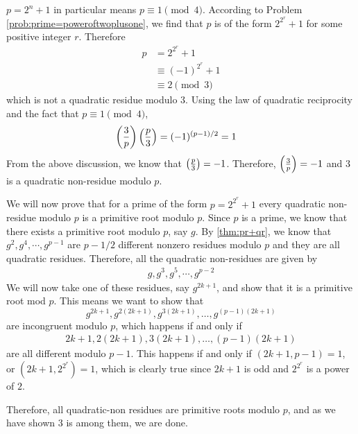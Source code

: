 \begin{solution}[1]
	$p=2^n+1$ in particular means $p \equiv 1 \pmod{4}$.
	According to Problem \ref{prob:prime=poweroftwoplusone}, we find that $p$ is of the form $2^{2^r} + 1$ for some positive integer $r$. Therefore
		\begin{align*}
			p
				& = 2^{2^{r}} +1\\
				& \equiv (-1)^{2^r} +1\\
				& \equiv 2 \pmod{3}
		\end{align*}
	which is not a quadratic residue modulo $3$.
	Using the law of quadratic reciprocity and the fact that $p \equiv 1 \pmod{4}$,
		\begin{align*}
			\left(\dfrac{3}{p}\right)\left(\dfrac{p}{3}\right)
				& = (-1)^{(p-1)/2} = 1
		\end{align*}
	From the above discussion, we know that $\left(\frac{p}{3}\right) = -1$. Therefore, $\left(\frac{3}{p}\right)=-1$ and $3$ is a quadratic non-residue modulo $p$.

	We will now prove that for a prime of the form $p=2^{2^{r}}+1$ every quadratic non-residue modulo $p$ is a primitive root modulo $p$. Since $p$ is a prime, we know that there exists a primitive root modulo $p$, say $g$. By \autoref{thm:pr+qr}, we know that $g^2,g^4,\cdots,g^{p-1}$ are ${p-1}/{2}$ different nonzero residues modulo $p$ and they are all quadratic residues. Therefore, all the quadratic non-residues are given by
		\begin{align*}
			g,g^3,g^5,\cdots,g^{p-2}
		\end{align*}
	We will now take one of these residues, say $g^{2k+1}$, and show that it is a primitive root mod ${p}$. This means we want to show that $$g^{2k+1},g^{2(2k+1)},g^{3(2k+1)},\ldots,g^{(p-1)(2k+1)}$$ are incongruent modulo $p$, which  happens if and only if
		\begin{align*}
			2k+1,2(2k+1),3(2k+1),\ldots,(p-1)(2k+1)
		\end{align*}
	are all different modulo ${p-1}$. This happens if and only if $(2k+1,p-1)=1$, or $(2k+1,2^{2^r})=1$, which is clearly true since $2k+1$ is odd and $2^{2^{r}}$ is a power of $2$.

	Therefore, all quadratic-non residues are primitive roots modulo $p$, and as we have shown $3$ is among them, we are done.
\end{solution}

